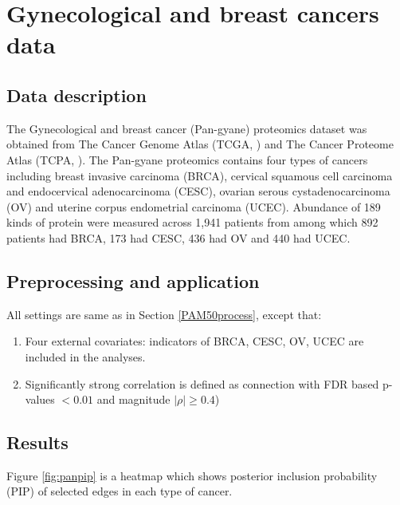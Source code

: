 \documentclass[
]{book}
\begin{document}
\hypertarget{Gyne}{%
\chapter{Gynecological and breast cancers data}\label{Gyne}}

\hypertarget{Gynedata}{%
\section{Data description}\label{Gynedata}}

The Gynecological and breast cancer (Pan-gyane) proteomics dataset was obtained from The Cancer Genome Atlas (TCGA, \citet{weinstein2013cancer}) and The Cancer Proteome Atlas (TCPA, \citet{li2013tcpa}). The Pan-gyane proteomics contains four types of cancers including breast invasive carcinoma (BRCA), cervical squamous cell carcinoma and endocervical adenocarcinoma (CESC), ovarian serous cystadenocarcinoma (OV) and uterine corpus endometrial carcinoma (UCEC). Abundance of 189 kinds of protein were measured across 1,941 patients from \citet{weinstein2013cancer} among which 892 patients had BRCA, 173 had CESC, 436 had OV and 440 had UCEC.

\hypertarget{Gyneprocess}{%
\section{Preprocessing and application}\label{Gyneprocess}}

All settings are same as in Section \ref{PAM50process}, except that:

\begin{enumerate}
\def\labelenumi{(\Roman{enumi})}
\item
  Four external covariates: indicators of BRCA, CESC, OV, UCEC are included in the analyses.
\item
  Significantly strong correlation is defined as connection with FDR based p-values \(<0.01\) and magnitude \(\mid \rho \mid \geq 0.4\))
\end{enumerate}

\hypertarget{Gyneresult}{%
\section{Results}\label{Gyneresult}}

Figure \ref{fig:panpip} is a heatmap which shows posterior inclusion probability (PIP) of selected edges in each type of cancer.
\end{document}
